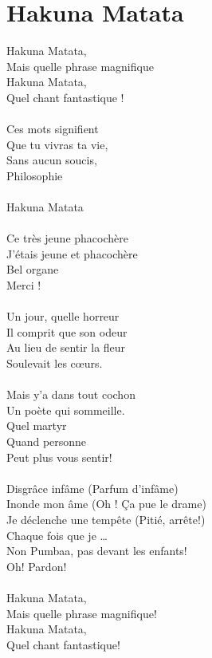 \section*{Hakuna Matata}
Hakuna Matata,\\
Mais quelle phrase magnifique\\
Hakuna Matata,\\
Quel chant fantastique !\\
\\
Ces mots signifient\\
Que tu vivras ta vie,\\
Sans aucun soucis,\\
Philosophie\\
\\
Hakuna Matata\\
\\
Ce très jeune phacochère\\
J’étais jeune et phacochère\\
Bel organe\\
Merci !\\
\\
Un jour, quelle horreur\\
Il comprit que son odeur\\
Au lieu de sentir la fleur\\
Soulevait les cœurs.\\
\\
Mais y’a dans tout cochon\\
Un poète qui sommeille.\\
Quel martyr\\
Quand personne\\
Peut plus vous sentir!\\
\\
Disgrâce infâme (Parfum d’infâme)\\
Inonde mon âme (Oh ! Ça pue le drame)\\
Je déclenche une tempête (Pitié, arrête!)\\
Chaque fois que je …\\
Non Pumbaa, pas devant les enfants!\\
Oh! Pardon!\\
\\
Hakuna Matata,\\
Mais quelle phrase magnifique!\\
Hakuna Matata,\\
Quel chant fantastique!\\
\\
